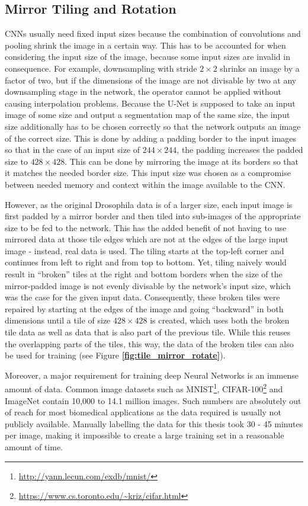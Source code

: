 		\subsection{Mirror Tiling and Rotation}
\label{subsec:mirror_tiling}
CNNs usually need fixed input sizes because the combination of convolutions and pooling shrink the image in a certain way. This has to be accounted for when considering the input size of the image, because some input sizes are invalid in consequence. For example, downsampling with stride $2 \times 2$ shrinks an image by a factor of two, but if the dimensions of the image are not divisable by two at any downsampling stage in the network, the operator cannot be applied without causing interpolation problems. Because the U-Net is supposed to take an input image of some size and output a segmentation map of the same size, the input size additionally has to be chosen correctly so that the network outputs an image of the correct size. This is done by adding a padding border to the input images so that in the case of an input size of $244 \times 244$, the padding increases the padded size to $428 \times 428$. This can be done by mirroring the image at its borders so that it matches the needed border size. This input size was chosen as a compromise between needed memory and context within the image available to the CNN.

However, as the original Drosophila data is of a larger size, each input image is first padded by a mirror border and then tiled into sub-images of the appropriate size to be fed to the network. This has the added benefit of not having to use mirrored data at those tile edges which are not at the edges of the large input image - instead, real data is used. The tiling starts at the top-left corner and continues from left to right and from top to bottom. Yet, tiling naively would result in ``broken'' tiles at the right and bottom borders when the size of the mirror-padded  image is not evenly divisable by the network's input size, which was the case for the given input data. Consequently, these broken tiles were repaired by starting at the edges of the image and going ``backward'' in both dimensions until a tile of size $428 \times 428$ is created, which uses both the broken tile data as well as data that is also part of the previous tile. While this reuses the overlapping parts of the tiles, this way, the data of the broken tiles can also be used for training (see Figure \textbf{\ref{fig:tile_mirror_rotate}}).

\noindent Moreover, a major requirement for training deep Neural Networks is an immense amount of data. Common image datasets such as MNIST\footnote{\url{http://yann.lecun.com/exdb/mnist/}}, CIFAR-100\footnote{\url{https://www.cs.toronto.edu/~kriz/cifar.html}} and ImageNet \cite{ILSVRC} contain 10,000 to 14.1 million images. Such numbers are absolutely out of reach for most biomedical applications as the data required is usually not publicly available. Manually labelling the data for this thesis took 30 - 45 minutes per image, making it impossible to create a large training set in a reasonable amount of time.

